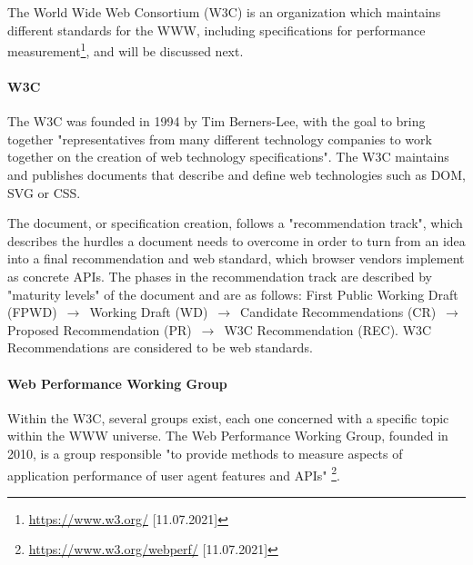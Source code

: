 The World Wide Web Consortium (W3C) is an organization which maintains different standards for the WWW, including specifications for performance measurement\footnote{\url{https://www.w3.org/} [11.07.2021]}, and will be discussed next.


\paragraph{W3C}


The W3C was founded in 1994 by Tim Berners-Lee, with the goal to bring together "representatives from many different technology companies to work together on the creation of web technology specifications". %
The W3C maintains and publishes documents that describe and define web technologies such as DOM, SVG or CSS. %



The document, or specification creation, follows a "recommendation track", which describes the hurdles a document needs to overcome in order to turn from an idea into a final recommendation and web standard, which browser vendors implement as concrete APIs. %
The phases in the recommendation track are described by "maturity levels" of the document and are as follows:
First Public Working Draft (FPWD) $\,\to\,$ Working Draft (WD) $\,\to\,$ Candidate Recommendations (CR) $\,\to\,$ Proposed Recommendation (PR) $\,\to\,$ W3C Recommendation (REC).  %
W3C Recommendations are considered to be web standards. %



\paragraph{Web Performance Working Group}


Within the W3C, several groups exist, each one concerned with a specific topic within the WWW universe. %
The Web Performance Working Group, founded in 2010, is a group responsible "to provide methods to measure aspects of application performance of user agent features and APIs" \footnote{\url{https://www.w3.org/webperf/} [11.07.2021]}.

